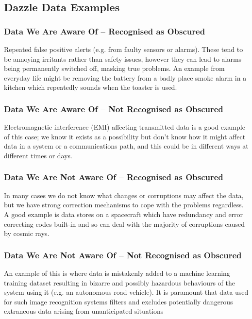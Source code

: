 \clearpage
\subsection{Dazzle Data Examples}

\subsubsection{Data We Are Aware Of -- Recognised as Obscured}
Repeated false positive alerts (e.g. from faulty sensors or alarms). These tend to be annoying irritants rather than safety issues, however they can lead to alarms being permanently switched off, masking true problems. An example from everyday life might be removing the battery from a badly place smoke alarm in a kitchen which repeatedly sounds when the toaster is used.

\subsubsection{Data We Are Aware Of -- Not Recognised as Obscured}
Electromagnetic interference (EMI) affecting transmitted data is a good example of this case; we know it exists as a possibility but don't know how it might affect data in a system or a communications path, and this could be in different ways at different times or days.

\subsubsection{Data We Are Not Aware Of -- Recognised as Obscured}
In many cases we do not know what changes or corruptions may affect the data, but we have strong correction mechanisms to cope with the problems regardless. A good example is data stores on a spacecraft which have redundancy and error correcting codes built-in and so can deal with the majority of corruptions caused by cosmic rays.

\subsubsection{Data We Are Not Aware Of -- Not Recognised as Obscured}
An example of this is where data is mistakenly added to a machine learning training \gls{dataset} resulting in bizarre and possibly hazardous behaviours of the system using it (e.g. an autonomous road vehicle). It is paramount that data used for such image recognition systems filters and excludes potentially dangerous extraneous data arising from unanticipated situations 

